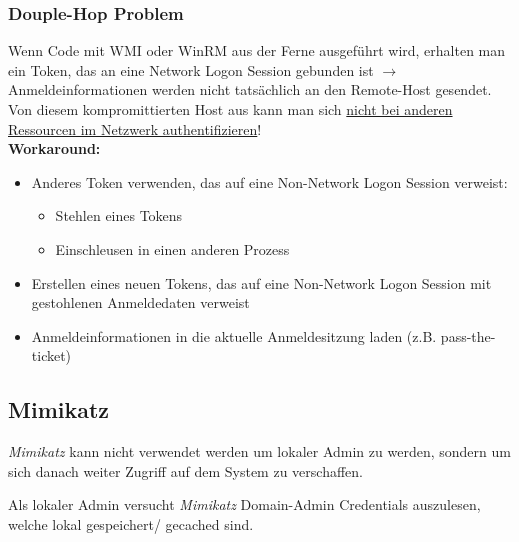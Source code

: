 \subsubsection{Douple-Hop Problem}
Wenn Code mit WMI oder WinRM aus der Ferne ausgeführt wird, erhalten man ein Token, das an eine Network Logon Session gebunden ist $\rightarrow$ Anmeldeinformationen werden nicht tatsächlich an den Remote-Host gesendet.\\
Von diesem kompromittierten Host aus kann man sich \underline{nicht bei anderen Ressourcen im Netzwerk authentifizieren}!\\
\textbf{Workaround:}
\begin{itemize}
    \item Anderes Token verwenden, das auf eine Non-Network Logon Session verweist:
    \begin{itemize}
        \item Stehlen eines Tokens
        \item Einschleusen in einen anderen Prozess
    \end{itemize}
    \item Erstellen eines neuen Tokens, das auf eine Non-Network Logon Session mit gestohlenen Anmeldedaten verweist
    \item Anmeldeinformationen in die aktuelle Anmeldesitzung laden (z.B. pass-the-ticket)
\end{itemize}

\subsection{Mimikatz}
\textit{Mimikatz} kann nicht verwendet werden um lokaler Admin zu werden, sondern um sich danach weiter Zugriff auf dem System zu verschaffen.

Als lokaler Admin versucht \textit{Mimikatz} Domain-Admin Credentials auszulesen, welche lokal gespeichert/ gecached sind.

